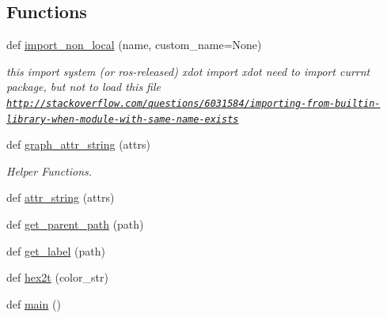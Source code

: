 \subsection*{Functions}
\begin{DoxyCompactItemize}
\item 
def \hyperlink{namespacesmacc__viewer_a7919eb78ad4d0254e2a024cdc956e56e}{import\+\_\+non\+\_\+local} (name, custom\+\_\+name=None)
\begin{DoxyCompactList}\small\item\em this import system (or ros-\/released) xdot import xdot need to import currnt package, but not to load this file \href{http://stackoverflow.com/questions/6031584/importing-from-builtin-library-when-module-with-same-name-exists}{\tt http\+://stackoverflow.\+com/questions/6031584/importing-\/from-\/builtin-\/library-\/when-\/module-\/with-\/same-\/name-\/exists} \end{DoxyCompactList}\item 
def \hyperlink{namespacesmacc__viewer_a22b916faeb443f12141a375c8e4e1c5f}{graph\+\_\+attr\+\_\+string} (attrs)
\begin{DoxyCompactList}\small\item\em Helper Functions. \end{DoxyCompactList}\item 
def \hyperlink{namespacesmacc__viewer_ac133c37694da94ec1d68458f72cf8cea}{attr\+\_\+string} (attrs)
\item 
def \hyperlink{namespacesmacc__viewer_a75fe995cc084c8e1bcbf45bfd7618638}{get\+\_\+parent\+\_\+path} (path)
\item 
def \hyperlink{namespacesmacc__viewer_ab45ec4827eaa89c42f52c3a2d06871cb}{get\+\_\+label} (path)
\item 
def \hyperlink{namespacesmacc__viewer_a96e53903efa626dbc5ba683667c295ef}{hex2t} (color\+\_\+str)
\item 
def \hyperlink{namespacesmacc__viewer_a04f8486232a137775a5ed79921b54f7b}{main} ()
\end{DoxyCompactItemize}
